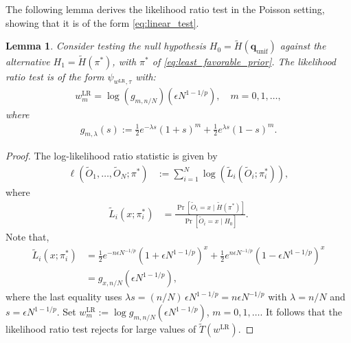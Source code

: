 \documentclass[11pt]{article}
\newtheorem{lem}[thm]{Lemma}
\numberwithin{equation}{section}
\newcommand{\LR}{\mathrm{LR}}
\newcommand{\unif}{\mathrm{unif}}
\newcommand{\Prp}[1]{\Pr\left[#1 \right]}
\begin{document}
The following lemma derives the likelihood ratio test in the Poisson setting, showing that it is of the form \eqref{eq:linear_test}. 
\begin{lem}
    \label{lem:unconditioned_LR_test}
    Consider testing the null hypothesis $H_0 = \tilde{H}(\mathbf{q}_{\unif})$ against the alternative $H_1 = \tilde{H}(\pi^*)$, with $\pi^*$ of \eqref{eq:least_favorable_prior}. The likelihood ratio test is of the form $\psi_{w^{\LR},\tau}$ with:
\begin{align}
\label{eq:LR_test_weights}
w^{\LR}_m = \log(g_{m,n/N})\!\left( \epsilon N^{1-1/p} \right),\quad m=0,1,\ldots,
\end{align}
where 
\begin{align}
\label{eq:g_def}
g_{m,\lambda}(s) := \frac{1}{2}e^{-\lambda s} \left( 1 + s \right)^{m} + \frac{1}{2}e^{\lambda s} \left( 1 - s \right)^{m}.
\end{align}
\end{lem}

\begin{proof}
The log-likelihood ratio statistic is given by
\begin{align*}
\ell(\tilde{O}_1,\ldots,\tilde{O}_N;\pi^*) & := \sum_{i=1}^N \log(\tilde{L}_i(\tilde{O}_i;\pi_i^*)), 
\end{align*}
where 
\begin{align*}
\tilde{L}_i(x;\pi_i^*) & = \frac{\Prp{\tilde{O}_i=x \mid \tilde{H}(\pi^*)} }{\Prp{\tilde{O}_i = x \mid H_0} }.
\end{align*}
Note that,
\begin{align*}
\tilde{L}_i(x;\pi_i^*) & = \frac{1}{2}e^{-n \epsilon N^{-1/p}} \left( 1 + \epsilon N^{1-1/p} \right)^{x} + \frac{1}{2}e^{n \epsilon N^{-1/p}} \left( 1 - \epsilon N^{1-1/p} \right)^{x} \\
& = g_{x,n/N}(\epsilon N^{1-1/p}), 
\end{align*}
where the last equality uses $\lambda s = (n/N)\,\epsilon N^{1-1/p} = n \epsilon N^{-1/p}$ with $\lambda = n/N$ and $s = \epsilon N^{1-1/p}$. Set $w^{\LR}_m := \log g_{m,n/N}(\epsilon N^{1-1/p})$, $m=0,1,\ldots$. It follows that the likelihood ratio test rejects for large values of $\tilde{T}(w^{\LR})$. 
\end{proof}
\end{document}
